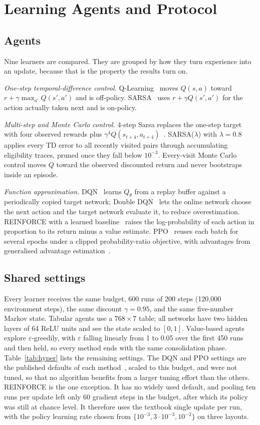 \section{Learning Agents and Protocol}
\label{sec:learning}

\subsection{Agents}
Nine learners are compared. They are grouped by how they turn experience into an update, because that is the property the results turn on.

\emph{One-step temporal-difference control.} Q-Learning~\cite{watkins1992} moves $Q(s,a)$ toward $r+\gamma\max_{a'}Q(s',a')$ and is off-policy. SARSA~\cite{rummery1994} uses $r+\gamma Q(s',a')$ for the action actually taken next and is on-policy.

\emph{Multi-step and Monte Carlo control.} 4-step Sarsa replaces the one-step target with four observed rewards plus $\gamma^4Q(s_{t+4},a_{t+4})$~\cite{sutton2018}. SARSA($\lambda$) with $\lambda=0.8$ applies every TD error to all recently visited pairs through accumulating eligibility traces, pruned once they fall below $10^{-3}$. Every-visit Monte Carlo control moves $Q$ toward the observed discounted return and never bootstraps inside an episode.

\emph{Function approximation.} DQN~\cite{mnih2015} learns $Q_\theta$ from a replay buffer against a periodically copied target network; Double DQN~\cite{vanhasselt2016} lets the online network choose the next action and the target network evaluate it, to reduce overestimation. REINFORCE with a learned baseline~\cite{williams1992} raises the log-probability of each action in proportion to its return minus a value estimate. PPO~\cite{schulman2017} reuses each batch for several epochs under a clipped probability-ratio objective, with advantages from generalised advantage estimation~\cite{schulman2016}.

\subsection{Shared settings}
Every learner receives the same budget, 600 runs of 200 steps (120{,}000 environment steps), the same discount $\gamma=0.95$, and the same five-number Markov state. Tabular agents use a $768\times7$ table; all networks have two hidden layers of 64 ReLU units and see the state scaled to $[0,1]$. Value-based agents explore $\varepsilon$-greedily, with $\varepsilon$ falling linearly from 1 to 0.05 over the first 450 runs and then held, so every method ends with the same consolidation phase. Table~\ref{tab:hyper} lists the remaining settings. The DQN and PPO settings are the published defaults of each method~\cite{mnih2015,schulman2017}, scaled to this budget, and were not tuned, so that no algorithm benefits from a larger tuning effort than the others. REINFORCE is the one exception. It has no widely used default, and pooling ten runs per update left only 60 gradient steps in the budget, after which its policy was still at chance level. It therefore uses the textbook single update per run, with the policy learning rate chosen from $\{10^{-3}, 3\cdot10^{-3}, 10^{-2}\}$ on three layouts.

